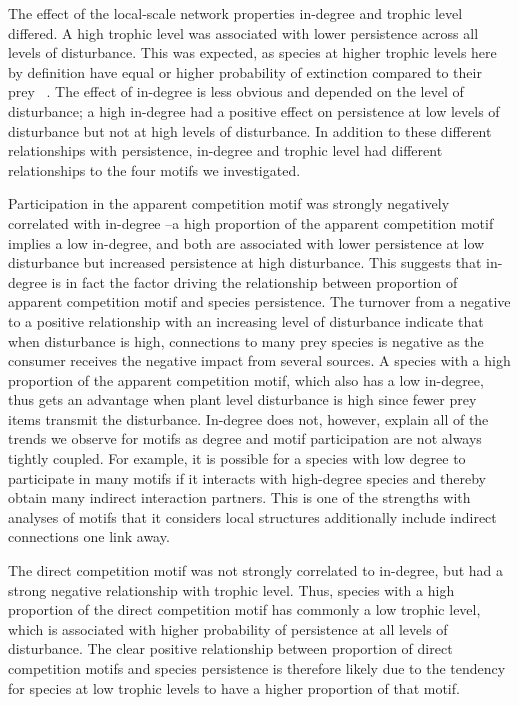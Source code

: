 \documentclass[12pt]{article}
\begin{document}
\begin{spacing}{2.0}
The effect of the local-scale network properties in-degree and trophic level differed.
A high trophic level was associated with lower persistence across all levels of disturbance. This was expected, as species at higher trophic levels here by definition have equal or higher probability of extinction compared to their prey ~\citep{Eklof2013}.
The effect of in-degree is less obvious and depended on the level of disturbance; a high in-degree had a positive effect on persistence at low levels of disturbance but not at high levels of disturbance.
In addition to these different relationships with persistence, in-degree and trophic level had different relationships to the four motifs we investigated.

Participation in the apparent competition motif was strongly negatively correlated with in-degree --a high proportion of the apparent competition motif implies a low in-degree, and both are associated with lower persistence at low disturbance but increased persistence at high disturbance. This suggests that in-degree is in fact the factor driving the relationship between proportion of apparent competition motif and species persistence. The turnover from a negative to a positive relationship with an increasing level of disturbance indicate that when disturbance is high, connections to many prey species is negative as the consumer receives the negative impact from several sources. A species with a high proportion of the apparent competition motif, which also has a low in-degree, thus gets an advantage when plant level disturbance is high since fewer prey items transmit the disturbance.
In-degree does not, however, explain all of the trends we observe for motifs as degree and motif participation are not always tightly coupled.
For example, it is possible for a species with low degree to participate in many motifs if it interacts with high-degree species and thereby obtain many indirect interaction partners. This is one of the strengths with analyses of motifs that it considers local structures additionally include indirect connections one link away.

The direct competition motif was not strongly correlated to in-degree, but had a strong negative relationship with trophic level. Thus, species with a high proportion of the direct competition motif has commonly a low trophic level, which is associated with higher probability of persistence at all levels of disturbance.
The clear positive relationship between proportion of direct competition motifs and species persistence is therefore likely due to the tendency for species at low trophic levels to have a higher proportion of that motif.



\end{spacing}
\end{document}
